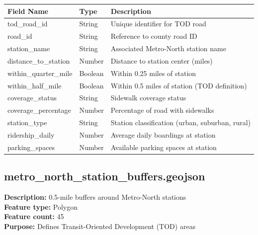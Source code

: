 \documentclass[11pt,letterpaper]{article}
\begin{document}
\begin{table}[h]
\centering
\caption{Attribute Dictionary - tod\_area\_roads.geojson}
\begin{longtable}{lll}
\toprule
\textbf{Field Name} & \textbf{Type} & \textbf{Description} \\
\midrule
tod\_road\_id & String & Unique identifier for TOD road \\
road\_id & String & Reference to county road ID \\
station\_name & String & Associated Metro-North station name \\
distance\_to\_station & Number & Distance to station center (miles) \\
within\_quarter\_mile & Boolean & Within 0.25 miles of station \\
within\_half\_mile & Boolean & Within 0.5 miles of station (TOD definition) \\
coverage\_status & String & Sidewalk coverage status \\
coverage\_percentage & Number & Percentage of road with sidewalks \\
station\_type & String & Station classification (urban, suburban, rural) \\
ridership\_daily & Number & Average daily boardings at station \\
parking\_spaces & Number & Available parking spaces at station \\
\bottomrule
\end{longtable}
\end{table}

\subsection{metro\_north\_station\_buffers.geojson}

\textbf{Description:} 0.5-mile buffers around Metro-North stations\\
\textbf{Feature type:} Polygon\\
\textbf{Feature count:} 45\\
\textbf{Purpose:} Defines Transit-Oriented Development (TOD) areas
\end{document}

